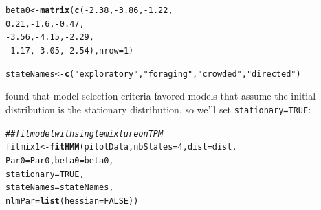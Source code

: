 \documentclass[12pt]{article}\usepackage[]{graphicx}\usepackage[]{xcolor}
\makeatletter
\newcommand{\hlnum}[1]{\textcolor[rgb]{0.686,0.059,0.569}{#1}}%
\newcommand{\hlsng}[1]{\textcolor[rgb]{0.192,0.494,0.8}{#1}}%
\newcommand{\hlcom}[1]{\textcolor[rgb]{0.678,0.584,0.686}{\textit{#1}}}%
\newcommand{\hlopt}[1]{\textcolor[rgb]{0,0,0}{#1}}%
\newcommand{\hldef}[1]{\textcolor[rgb]{0.345,0.345,0.345}{#1}}%
\newcommand{\hlkwb}[1]{\textcolor[rgb]{0.69,0.353,0.396}{#1}}%
\newcommand{\hlkwc}[1]{\textcolor[rgb]{0.333,0.667,0.333}{#1}}%
\newcommand{\hlkwd}[1]{\textcolor[rgb]{0.737,0.353,0.396}{\textbf{#1}}}%
\newenvironment{kframe}{%
 \def\at@end@of@kframe{}%
 \ifinner\ifhmode%
  \def\at@end@of@kframe{\end{minipage}}%
  \begin{minipage}{\columnwidth}%
 \fi\fi%
 \def\FrameCommand##1{\hskip\@totalleftmargin \hskip-\fboxsep
 \colorbox{shadecolor}{##1}\hskip-\fboxsep
     \hskip-\linewidth \hskip-\@totalleftmargin \hskip\columnwidth}%
 \MakeFramed {\advance\hsize-\width
   \@totalleftmargin\z@ \linewidth\hsize
   \@setminipage}}%
 {\par\unskip\endMakeFramed%
 \at@end@of@kframe}
\newenvironment{knitrout}{}{} %
\let\hlstd\hldef
\makeatother
\begin{document}
\begin{knitrout}
\begin{kframe}
\begin{alltt}
\hldef{beta0} \hlkwb{<-} \hlkwd{matrix}\hldef{(}\hlkwd{c}\hldef{(}\hlopt{-}\hlnum{2.38}\hldef{,} \hlopt{-}\hlnum{3.86}\hldef{,} \hlopt{-}\hlnum{1.22}\hldef{,}
                   \hlnum{0.21}\hldef{,}  \hlopt{-}\hlnum{1.6}\hldef{,} \hlopt{-}\hlnum{0.47}\hldef{,}
                  \hlopt{-}\hlnum{3.56}\hldef{,} \hlopt{-}\hlnum{4.15}\hldef{,} \hlopt{-}\hlnum{2.29}\hldef{,}
                  \hlopt{-}\hlnum{1.17}\hldef{,} \hlopt{-}\hlnum{3.05}\hldef{,} \hlopt{-}\hlnum{2.54}\hldef{),}\hlkwc{nrow}\hldef{=}\hlnum{1}\hldef{)}

\hldef{stateNames} \hlkwb{<-} \hlkwd{c}\hldef{(}\hlsng{"exploratory"}\hldef{,}\hlsng{"foraging"}\hldef{,}\hlsng{"crowded"}\hldef{,}\hlsng{"directed"}\hldef{)}
\end{alltt}
\end{kframe}
\end{knitrout}
\noindent \cite{IsojunnoEtAl2017} found that model selection criteria favored models that assume the initial distribution is the stationary distribution, so we'll set \verb|stationary=TRUE|:
\begin{knitrout}
\color{fgcolor}\begin{kframe}
\begin{alltt}
\hlcom{## fit model with single mixture on TPM}
\hlstd{fitmix1} \hlkwb{<-} \hlkwd{fitHMM}\hlstd{(pilotData,} \hlkwc{nbStates}\hlstd{=}\hlnum{4}\hlstd{,} \hlkwc{dist}\hlstd{=dist,}
                  \hlkwc{Par0}\hlstd{=Par0,} \hlkwc{beta0}\hlstd{=beta0,}
                  \hlkwc{stationary}\hlstd{=}\hlnum{TRUE}\hlstd{,}
                  \hlkwc{stateNames}\hlstd{=stateNames,}
                  \hlkwc{nlmPar}\hlstd{=}\hlkwd{list}\hlstd{(}\hlkwc{hessian}\hlstd{=}\hlnum{FALSE}\hlstd{))}
\end{alltt}
\end{kframe}
\end{knitrout}
\end{document}
